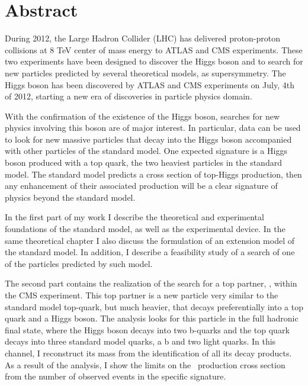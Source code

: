 \begingroup
\let\clearpage\relax
\let\cleardoublepage\relax
\let\cleardoublepage\relax

\chapter*{Abstract}

During 2012, the Large Hadron Collider (LHC) has delivered proton-proton collisions at 8 TeV center of mass energy to ATLAS and CMS experiments. These two experiments have been designed to discover the Higgs boson and to search for new particles predicted by several theoretical models, as supersymmetry. The Higgs boson has been discovered by ATLAS and CMS experiments on July, 4th of 2012, starting a new era of discoveries in particle physics domain. %

With the confirmation of the existence of the Higgs boson, searches for new physics involving this boson are of major interest. In particular, data can be used to look for new massive particles that decay into the Higgs boson accompanied with other particles of the standard model. One expected signature is a Higgs boson produced with a top quark, the two heaviest particles in the standard model. The standard model predicts a cross section of top-Higgs production, then any enhancement of their associated production will be a clear signature of physics beyond the standard model.

In the first part of my work I describe the theoretical and experimental foundations of the standard model, as well as the experimental device. In the same theoretical chapter I also discuss the formulation of an extension model of the standard model. In addition, I describe a feasibility study of a search of one of the particles predicted by such model.

The second part contains the realization of the search for a top partner, \Tp, within the CMS experiment. This top partner is a new particle very similar to the standard model top-quark, but much heavier, that decays preferentially into a top quark and a Higgs boson. The analysis looks for this particle in the full hadronic final state, where the Higgs boson decays into two b-quarks and the top quark decays into three standard model quarks, a b and two light quarks. In this channel, I reconstruct its mass from the identification of all its decay products. As a result of the analysis, I show the limits on the \Tp~production cross section from the number of observed events in the specific signature.

